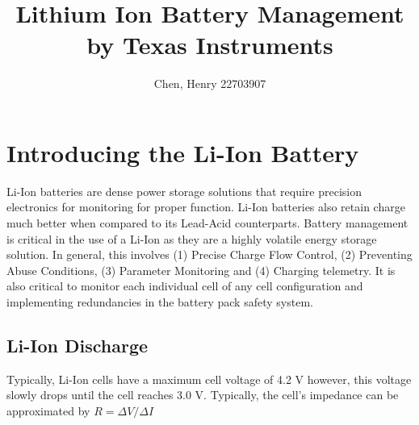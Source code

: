 \documentclass[]{report}
\author{Chen, Henry 22703907}
\title{Lithium Ion Battery Management by Texas Instruments}
\begin{document}
\maketitle

\chapter{Introducing the Li-Ion Battery}
Li-Ion batteries are dense power storage solutions that require precision electronics for monitoring for proper function. Li-Ion batteries also retain charge much better when compared to its Lead-Acid counterparts. Battery management is critical in the use of a Li-Ion as they are a highly volatile energy storage solution. In general, this involves (1) Precise Charge Flow Control, (2) Preventing Abuse Conditions, (3) Parameter Monitoring and (4) Charging telemetry. It is also critical to monitor each individual cell of any cell configuration and implementing redundancies in the battery pack safety system.

\section{Li-Ion Discharge}
Typically, Li-Ion cells have a maximum cell voltage of 4.2 V however, this voltage slowly drops until the cell reaches 3.0 V. Typically, the cell's impedance can be approximated by $R=\Delta V/\Delta I$
\end{document}
